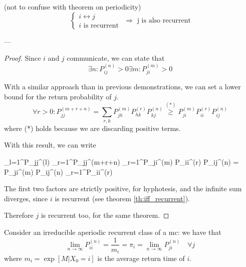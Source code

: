 	\begin{theorem}
		(not to confuse with theorem on periodicity)
		\begin{equation}
			\begin{cases}
				i\leftrightarrow j \\
				i \text{ is recurrent }
			\end{cases} \Rightarrow \text{ j is also recurrent}
		\end{equation}
	\end{theorem}
	---
	\begin{proof}
		Since $i$ and $j$ communicate, we can state that
		\begin{equation}
			\exists n: P_{ij}^{(n)} > 0
			\exists m: P_{ji}^{(m)} > 0
		\end{equation}

		With a similar approach than in previous demonstrations, we can set a lower bound for the return probability of $j$.
		\begin{equation}
			\forall r>0 : P_{jj}^{(m+r+n)}
				= \sum_{r, k} P_{jh}^{(m)} P_{hk}^{(r)} P_{kj}^{(n)}
				\stackrel{(*)}{\geq} P_{ji}^{(m)}  P_{ii}^{(r)}  P_{ij}^{(n)}
		\end{equation}
		where (*) holds because we are discarding positive terms.

		With this result, we can write
		\begin{esp}
			\sum_{l=1}^\infty P_{jj}^{(l)}
				\geq \sum_{r=1}^\infty P_{jj}^{(m+r+n)}
				\geq \sum_{r=1}^\infty P_{ji}^{(m)}  P_{ii}^{(r)}  P_{ij}^{(n)} = P_{ji}^{(m)} P_{ij}^{(n)} \sum_{r=1}^\infty P_{ii}^{(r)}
		\end{esp}

		The first two factors are strictly positive, for hyphotesis, and the infinite sum diverges, since $i$ is recurrent (see theorem \ref{th:iff_recurrent}).

		Therefore $j$ is recurrent too, for the same theorem.
  \end{proof}

	\begin{theorem}
		Consider an irreducible aperiodic recurrent class of a \gls{mc}: we have that
		\begin{equation}
			\lim_{n\to \infty} P_{ii}^{(n)}
				= \frac{1}{m_i}
				= \pi_i = \lim_{n\to\infty} P_{ji}^{(n)} \quad \forall j
		\end{equation}
		where $m_i = \exp[M | X_0 = i]$ is the average return time of $i$.
	\end{theorem}

